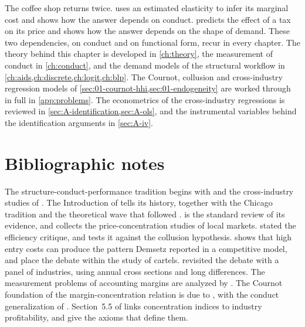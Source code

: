 The coffee shop returns twice.  uses an estimated elasticity to infer its marginal cost and shows
how the answer depends on conduct.  predicts the effect of a tax on its price and shows how
the answer depends on the shape of demand. These two dependencies, on conduct and on functional form, recur in
every chapter. The theory behind this chapter is developed in \cref{ch:theory}, the measurement of conduct in
\cref{ch:conduct}, and the demand models of the structural workflow in \cref{ch:aids,ch:discrete,ch:logit,ch:blp}.
The Cournot, collusion and cross-industry regression models of \cref{sec:01-cournot-hhi,sec:01-endogeneity} are
worked through in full in \cref{app:problems}. The econometrics of the cross-industry regressions is reviewed in
\cref{sec:A-identification,sec:A-ols}, and the instrumental variables behind the identification arguments in
\cref{sec:A-iv}.






\section{Bibliographic notes}\label{sec:01-bibnotes}

The structure-conduct-performance tradition begins with \citet{Mason1939} and the cross-industry studies of
\citet{Bain1951,Bain1956}. The Introduction of \citet{Tirole1988} tells its history, together with the Chicago
tradition and the theoretical wave that followed \citep{Joskow1975}. \citet{Schmalensee1989} is the standard
review of its evidence, and \citet{Weiss1989} collects the price-concentration studies of local markets.
\citet{Demsetz1973} stated the efficiency critique, and \citet{Schmalensee1987} tests it against the collusion
hypothesis. \citet{Hopenhayn1992} shows that high entry costs can produce the pattern Demsetz reported in a
competitive model, and
\citet{LevensteinSuslow2006} place the debate within the study of cartels. \citet{Salinger1990} revisited the debate with a panel of
industries, using annual cross sections and long differences. The measurement problems of accounting margins are analyzed by
\citet{FisherMcGowan1983}. The Cournot foundation of the margin-concentration relation is due to
\citet{CowlingWaterson1976}, with the conduct generalization of \citet{ClarkeDavies1982}. Section~5.5 of
\citet{Tirole1988} links concentration indices to industry profitability, and \citet{EncaouaJacquemin1980} give
the axioms that define them.

